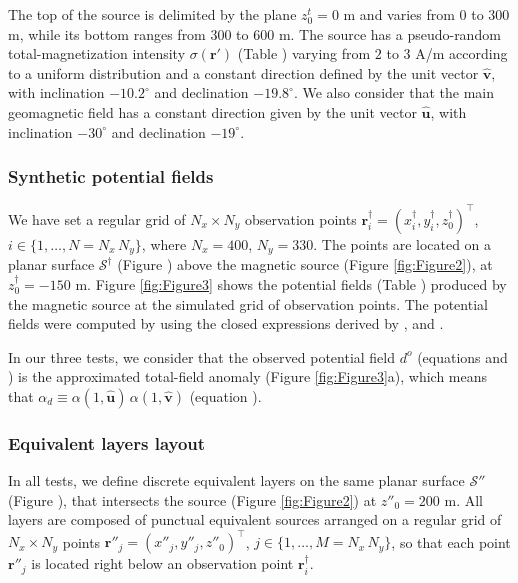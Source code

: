 The top of the source is delimited by the plane $z^{t}_{0} = 0$ m and varies 
from $0$ to $300$ m, while its bottom ranges from $300$ to $600$ m.
The source has a pseudo-random total-magnetization intensity $\sigma(\mathbf{r}')$ (Table ) 
varying from $2$ to $3$ A/m according to a uniform distribution and a constant direction defined by the 
unit vector $\hat{\mathbf{v}}$, with inclination $-10.2^{\circ}$ and declination $-19.8^{\circ}$. 
We also consider that the main geomagnetic field has a constant direction given by the unit vector $\hat{\mathbf{u}}$,
with inclination $-30^{\circ}$ and declination $-19^{\circ}$. 

\subsubsection{Synthetic potential fields}

We have set a regular grid of $N_{x} \times N_{y}$ observation points 
$\mathbf{r}^{\dagger}_{i} = (x^{\dagger}_{i}, y^{\dagger}_{i}, z^{\dagger}_{0})^{\top}$, $i \in \{1, \dots, N = N_{x} \, N_{y}\}$,
where $N_{x} = 400$, $N_{y} = 330$. 
The points are located on a planar surface $\mathcal{S}^{\dagger}$ (Figure ) above the magnetic source
(Figure \ref{fig:Figure2}), at $z^{\dagger}_{0} = -150$ m.
Figure \ref{fig:Figure3} shows the potential fields (Table ) produced by the magnetic source at 
the simulated grid of observation points.
The potential fields were computed by using the closed expressions derived by \cite{Nagyetal2000}, \cite{Nagyetal2002} 
and \cite{Fukushima2020}.

In our three tests, we consider that the observed potential field $d^{o}$ (equations  and ) 
is the approximated total-field anomaly (Figure \ref{fig:Figure3}a), which means that 
$\alpha_{d} \equiv \alpha(1, \hat{\mathbf{u}}) \, \alpha(1, \hat{\mathbf{v}})$ (equation ).

\subsubsection{Equivalent layers layout}

In all tests, we define discrete equivalent layers on the same planar surface $\mathcal{S}''$ (Figure ), 
that intersects the source (Figure \ref{fig:Figure2}) at $z''_{0} = 200$ m.
All layers are composed of punctual equivalent sources arranged on a regular grid of $N_{x} \times N_{y}$ points 
$\mathbf{r}''_{j} = (x''_{j}, y''_{j}, z''_{0})^{\top}$, $j \in \{1, \dots, M = N_{x} \, N_{y}\}$,
so that each point $\mathbf{r}''_{j}$ is located right below an observation point $\mathbf{r}^{\dagger}_{i}$.

